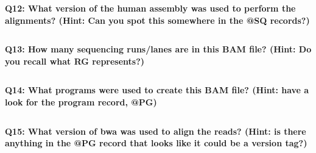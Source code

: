 \documentclass[11pt]{article}
\makeatletter
\newcommand{\boxspacing}{\kern\kvtcb@left@rule\kern\kvtcb@boxsep}
\newcommand{\prompt}[4]{
        {\ttfamily\llap{{\color{blue}\LARGE\faKeyboardO\hspace{3pt}#4}}\vspace{-\baselineskip}}
    }
\makeatother
\begin{document}
    \textbf{Q12: What version of the human assembly was used to perform the
alignments? (Hint: Can you spot this somewhere in the @SQ records?)}

    \begin{tcolorbox}[breakable, size=fbox, boxrule=1pt, pad at break*=1mm,colback=cellbackground, colframe=cellborder]
\prompt{In}{incolor}{ }{\boxspacing}
\begin{Verbatim}[commandchars=\\\{\}]

\end{Verbatim}
\end{tcolorbox}

    \textbf{Q13: How many sequencing runs/lanes are in this BAM file? (Hint:
Do you recall what RG represents?)}

    \begin{tcolorbox}[breakable, size=fbox, boxrule=1pt, pad at break*=1mm,colback=cellbackground, colframe=cellborder]
\prompt{In}{incolor}{ }{\boxspacing}
\begin{Verbatim}[commandchars=\\\{\}]

\end{Verbatim}
\end{tcolorbox}

    \textbf{Q14: What programs were used to create this BAM file? (Hint:
have a look for the program record, @PG)}

    \begin{tcolorbox}[breakable, size=fbox, boxrule=1pt, pad at break*=1mm,colback=cellbackground, colframe=cellborder]
\prompt{In}{incolor}{ }{\boxspacing}
\begin{Verbatim}[commandchars=\\\{\}]

\end{Verbatim}
\end{tcolorbox}

    \textbf{Q15: What version of bwa was used to align the reads? (Hint: is
there anything in the @PG record that looks like it could be a version
tag?)}

    \begin{tcolorbox}[breakable, size=fbox, boxrule=1pt, pad at break*=1mm,colback=cellbackground, colframe=cellborder]
\prompt{In}{incolor}{ }{\boxspacing}
\begin{Verbatim}[commandchars=\\\{\}]

\end{Verbatim}
\end{tcolorbox}
\end{document}
